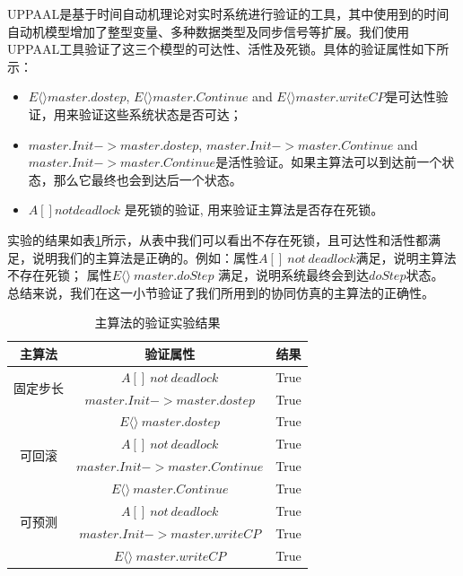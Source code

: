 UPPAAL是基于时间自动机理论对实时系统进行验证的工具，其中使用到的时间自动机模型增加了整型变量、多种数据类型及同步信号等扩展。我们使用UPPAAL工具验证了这三个模型的可达性、活性及死锁。具体的验证属性如下所示：
\begin{itemize}
\item
$E \langle\rangle master.dostep$, $E\langle\rangle master.Continue$ and $E\langle\rangle master.writeCP$是可达性验证，用来验证这些系统状态是否可达；
\item
$master.Init -> master.dostep$, $master.Init -> master.Continue$ and $master.Init -> master.Continue$是活性验证。如果主算法可以到达前一个状态，那么它最终也会到达后一个状态。
\item
$A[] not deadlock$ 是死锁的验证, 用来验证主算法是否存在死锁。
\end{itemize}
实验的结果如表\ref{ta_r}所示，从表中我们可以看出不存在死锁，且可达性和活性都满足，说明我们的主算法是正确的。例如：属性$A[]~not~deadlock$满足，说明主算法不存在死锁； 属性$E\langle\rangle~master.doStep$ 满足，说明系统最终会到达$doStep$状态。 总结来说，我们在这一小节验证了我们所用到的协同仿真的主算法的正确性。
\begin{table}
\caption{主算法的验证实验结果}
\centering
\begin{tabular}{c c c}
          \hline
          主算法 & 验证属性 & 结果\\
       \hline
        \multirow{2}{2.0cm}{固定步长}
                & $A[]~not~deadlock$ & True\\
                & $master.Init -> master.dostep$ & True\\
                & $E\langle\rangle~master.dostep$ & True\\

        \hline
        \multirow{2}{2.0cm}{可回滚}
                & $A[]~not~deadlock$ & True\\
                & $master.Init -> master.Continue$ & True\\
                & $E\langle\rangle~master.Continue$ & True\\

        \hline
        \multirow{2}{2.0cm}{可预测}
                & $A[]~not~deadlock$ & True\\
                & $master.Init -> master.writeCP$ & True\\
                & $E\langle\rangle~master.writeCP$ & True\\
        \hline
\end{tabular}
\label{ta_r}
\end{table}

